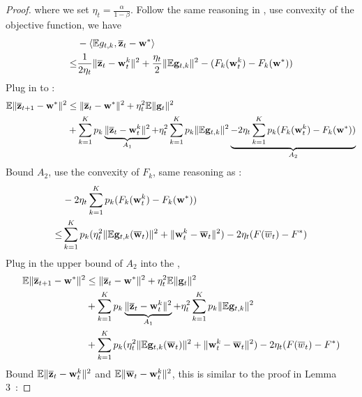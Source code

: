 \begin{proof}
where we set $\eta_t = \frac{\alpha}{1- \beta}$. Follow the same reasoning 
in \eq{\ref{eq:4}}, use convexity of the objective function, we have 
\begin{align}
   & - \left<\mathbb{E} g_{t,k}, \overline{{\mathbf{z}}}_{t} - {\mathbf{w}}^*\right> \\
	\leq & \frac{1}{2\eta_t} \|\overline{{\mathbf{z}}}_t - {\mathbf{w}}_t^k\|^2 + \frac{\eta_t}{2} \|\mathbb{E} {\mathbf{g}}_{t,k}\|^2 - (F_k({\mathbf{w}}_t^k) - F_k({\mathbf{w}}^*)) \label{eq:nagcvx2}
\end{align}
Plug in \eq{\ref{eq:nagcvx2}} to \eq{\ref{eq:nagcvx1}}:
\begin{align}
	\mathbb{E}\|\overline{{\mathbf{z}}}_{t+1} - {\mathbf{w}}^* \|^2 & \leq \| \overline{{\mathbf{z}}}_{t} - {\mathbf{w}}^*\|^2  +  \eta_t^2\mathbb{E}\|{\mathbf{g}}_t\|^2  \\
	&  + \sum_{k=1}^K p_k \underbrace{\|\overline{{\mathbf{z}}}_t - {\mathbf{w}}_t^k\|^2}_{A_1}  +\eta^2_t \sum_{k=1}^K p_k\|\mathbb{E} {\mathbf{g}}_{t,k}\|^2 \underbrace{- 2\eta_t\sum_{k=1}^K p_k(F_k({\mathbf{w}}_t^k) - F_k({\mathbf{w}}^*))}_{A_2} \label{eq:nagcvx3}
\end{align}
Bound $A_2$, use the convexity of $F_k$, same reasoning as \eq{\ref{eq:a24}}:
\begin{align*}
& -2\eta_t\sum_{k=1}^K p_k (F_k({\mathbf{w}}_t^k) - F_k({\mathbf{w}}^*)) \\
\leq &\sum_{k=1}^K p_k (\eta_t^2 \|\mathbb{E} {\mathbf{g}}_{t,k}(\overline{{\mathbf{w}}}_t) \|^2 +\|{\mathbf{w}}_t^k - \overline{{\mathbf{w}}}_t\|^2) -2\eta_t (F(\overline{w}_t) - F^*)
\end{align*}
Plug in the upper bound of $A_2$ into the \eq{\ref{eq:nagcvx3}}, 
\begin{align}
	\mathbb{E}\|\overline{{\mathbf{z}}}_{t+1} - {\mathbf{w}}^* \|^2 & \leq \| \overline{{\mathbf{z}}}_{t} - {\mathbf{w}}^*\|^2  +  \eta_t^2\mathbb{E}\|{\mathbf{g}}_t\|^2  \nonumber\\
	&  + \sum_{k=1}^K p_k \underbrace{\|\overline{{\mathbf{z}}}_t - {\mathbf{w}}_t^k\|^2}_{A_1}  +\eta^2_t \sum_{k=1}^K p_k\|\mathbb{E} {\mathbf{g}}_{t,k}\|^2 \nonumber \\
	& + \sum_{k=1}^K p_k (\eta_t^2 \|\mathbb{E} {\mathbf{g}}_{t,k}(\overline{{\mathbf{w}}}_t)\|^2 + \|{\mathbf{w}}_t^k - \overline{{\mathbf{w}}}_t\|^2) - 2\eta_t(F(\overline{w}_t) - F^*) 
	\label{eq:nagcvx4}
\end{align}
Bound $\mathbb{E}\|\overline{{\mathbf{z}}}_t - {\mathbf{w}}_t^k\|^2$ and $\mathbb{E} \|\overline{{\mathbf{w}}}_t- {\mathbf{w}}_t^k \|^2$, this is similar to the proof in Lemma 3~\cite{li2019convergence}: 


\end{proof}
